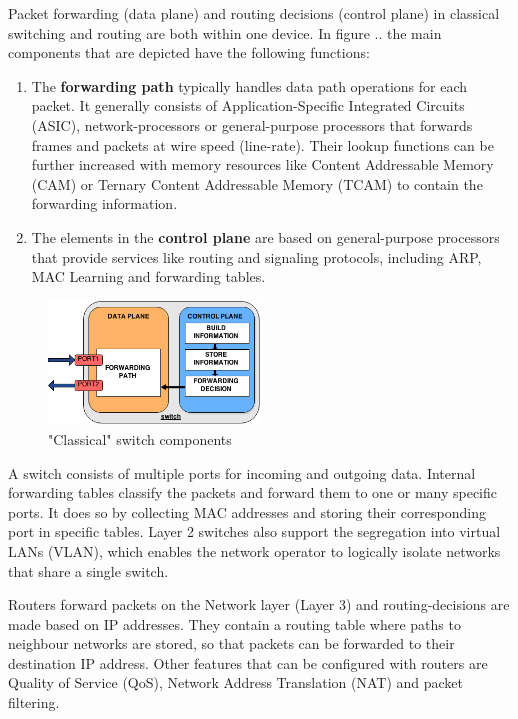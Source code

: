 Packet forwarding (data plane) and routing decisions (control plane) in classical switching and routing are both within one device. In figure .. %
 the main components that are depicted have the following functions:
\begin{enumerate}
\item The \textbf{forwarding path} typically handles data path operations for each packet. It generally consists of Application-Specific Integrated Circuits (ASIC), network-processors or general-purpose processors that forwards frames and packets at wire speed (line-rate). Their lookup functions can be further increased with memory resources like Content Addressable Memory (CAM) or Ternary Content Addressable Memory (TCAM) to contain the forwarding information.
\item The elements in the \textbf{control plane} are based on general-purpose processors that provide services like routing and signaling protocols, including ARP, MAC Learning and forwarding tables.
\end{enumerate}

\begin{figure}[H]
\centering

\includegraphics[width=0.5\textwidth]{images/fundamentals/switch_components}

\caption{"Classical" switch components}
\end{figure}

A switch consists of multiple ports for incoming and outgoing data. Internal forwarding tables classify the packets and forward them to one or many specific ports. It does so by collecting MAC addresses and storing their corresponding port in specific tables. Layer 2 switches also support the segregation into virtual LANs (VLAN), which enables the network operator to logically isolate networks that share a single switch.

Routers forward packets on the Network layer (Layer 3) and routing-decisions are made based on IP addresses. They contain a routing table where paths to neighbour networks are stored, so that packets can be forwarded to their destination IP address. Other features that can be configured with routers are Quality of Service (QoS), Network Address Translation (NAT) and packet filtering.

